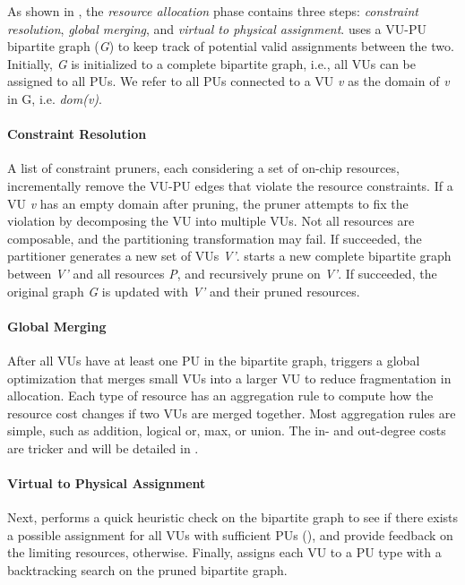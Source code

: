As shown in , the \emph{resource allocation} phase contains three steps:
\emph{constraint resolution}, \emph{global merging}, and \emph{virtual to physical assignment}.
\name uses a VU-PU bipartite graph (\emph{G}) to keep track of potential valid assignments between the two.
Initially, \emph{G} is initialized to a complete bipartite graph, i.e., all VUs can be assigned to
all PUs.
We refer to all PUs connected to a VU \emph{v} as the domain of \emph{v} in G, i.e. \emph{dom(v)}.

\paragraph{Constraint Resolution}
A list of constraint pruners, each considering a set of on-chip resources, 
incrementally remove the VU-PU edges that violate the resource constraints.
If a VU \emph{v} has an empty domain after pruning, the pruner attempts to fix the violation by
decomposing the VU into multiple VUs. 
Not all resources are composable, and the partitioning transformation may fail.
If succeeded, the partitioner generates a new set of VUs \emph{V'}. \name starts a new complete bipartite
graph between \emph{V'} and all resources \emph{P}, and recursively prune on \emph{V'}.
If succeeded, the original graph \emph{G} is updated with \emph{V'} and their pruned resources.

\paragraph{Global Merging}
After all VUs have at least one PU in the bipartite graph, \name triggers a global optimization that merges 
small VUs into a larger VU to reduce fragmentation in allocation.
Each type of resource has an aggregation rule to compute how the resource cost changes if two VUs are merged
together. Most aggregation rules are simple, such as addition, logical or, max, or union.
The in- and out-degree costs are tricker and will be detailed in .

\paragraph{Virtual to Physical Assignment}
Next, \name performs a quick heuristic check on the bipartite graph to see if there exists a
possible assignment for all VUs with sufficient PUs (), and provide feedback on the limiting resources, otherwise.
Finally, \name assigns each VU to a PU type with a backtracking search on the pruned bipartite
graph.

